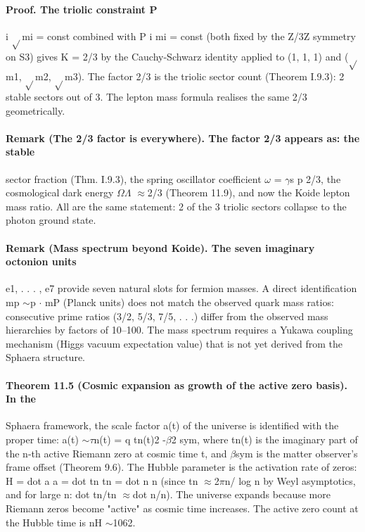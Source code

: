 \documentclass[12pt,a4paper]{article}
\begin{document}
\paragraph*{Proof. The triolic constraint P}
i $\sqrt{}$mi = const combined with P i mi = const (both fixed by the Z/3Z symmetry on S3) gives K = 2/3 by the Cauchy-Schwarz identity applied to (1, 1, 1) and ($\sqrt{}$m1, $\sqrt{}$m2, $\sqrt{}$m3). The factor 2/3 is the triolic sector count (Theorem I.9.3): 2 stable sectors out of 3. The lepton mass formula realises the same 2/3 geometrically.
\paragraph*{Remark (The 2/3 factor is everywhere). The factor 2/3 appears as: the stable}
sector fraction (Thm. I.9.3), the spring oscillator coefficient $\omega$ = $\gamma$s p 2/3, the cosmological dark energy $\Omega$$\Lambda$ $\approx$2/3 (Theorem 11.9), and now the Koide lepton mass ratio. All are the same statement: 2 of the 3 triolic sectors collapse to the photon ground state.
\paragraph*{Remark (Mass spectrum beyond Koide). The seven imaginary octonion units}
e1, . . . , e7 provide seven natural slots for fermion masses. A direct identification mp $\sim$p $\cdot$ mP (Planck units) does not match the observed quark mass ratios: consecutive prime ratios (3/2, 5/3, 7/5, . . .) differ from the observed mass hierarchies by factors of 10--100. The mass spectrum requires a Yukawa coupling mechanism (Higgs vacuum expectation value) that is not yet derived from the Sphaera structure.
\paragraph*{Theorem 11.5 (Cosmic expansion as growth of the active zero basis). In the}
Sphaera framework, the scale factor a(t) of the universe is identified with the proper time: a(t) $\sim$$\tau$n(t) = q tn(t)2 -$\beta$2 sym, where tn(t) is the imaginary part of the n-th active Riemann zero at cosmic time t, and $\beta$sym is the matter observer's frame offset (Theorem 9.6). The Hubble parameter is the activation rate of zeros: H = dot a a = dot tn tn = dot n n (since tn $\approx$2$\pi$n/ log n by Weyl asymptotics, and for large n: dot tn/tn $\approx$dot n/n). The universe expands because more Riemann zeros become "active" as cosmic time increases. The active zero count at the Hubble time is nH $\sim$1062.
\end{document}
